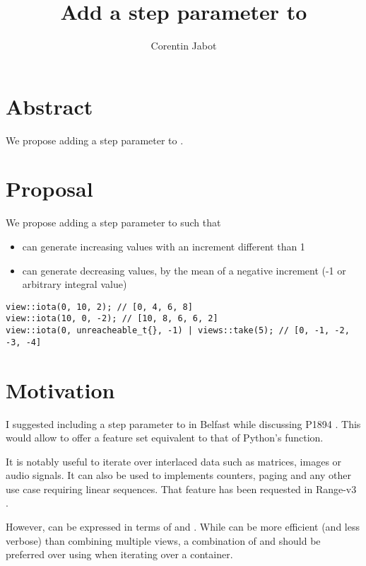 \documentclass{wg21}
\title{Add a step parameter to \tcode{iota\_view}}
\author{Corentin Jabot}{corentin.jabot@gmail.com}
\begin{document}
    
\maketitle


\section{Abstract}

We propose adding a step parameter to .

\section{Proposal}

We propose adding a step parameter to  such that

\begin{itemize}
\item {} can generate increasing values with an increment different than 1
\item {} can generate decreasing values, by the mean of a negative increment (-1 or arbitrary integral value) 
\end{itemize}

\begin{lstlisting}[style=CPP]
view::iota(0, 10, 2); // [0, 4, 6, 8]
view::iota(10, 0, -2); // [10, 8, 6, 6, 2]
view::iota(0, unreacheable_t{}, -1) | views::take(5); // [0, -1, -2, -3, -4]
\end{lstlisting}

\section{Motivation}

I suggested including a step parameter to  in Belfast while discussing P1894 \cite{P1894R0}.
This would allow  to offer a feature set equivalent to that of Python's  function.

It is notably useful to iterate over interlaced data such as matrices, images or audio signals.
It can also be used to implements counters, paging and any other use case requiring linear sequences.
That feature has been requested in Range-v3 \cite{RangeV3}.


However,  can be expressed in terms of  \cite{P1899R0} and .
While  can be more efficient (and less verbose) than combining multiple views, a combination of  and  should be preferred over using  when iterating over a container.
\end{document}
